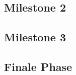 \documentclass{article}
\begin{document}
\subsection{Milestone 2}

\subsection{Milestone 3}

\subsection{Finale Phase}
\end{document}
